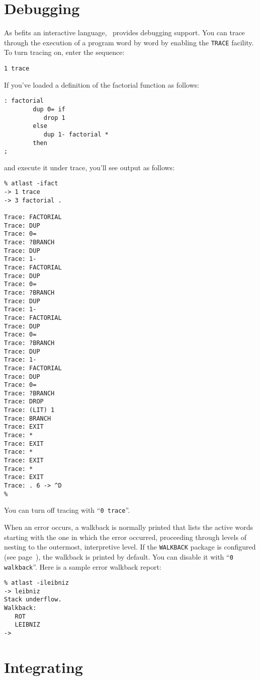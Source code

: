 \documentclass[twocolumn]{article}
\begin{document}
\section{Debugging}

As befits an interactive language, \atlast\ provides debugging support.
You can trace through the execution of a program word by word by
enabling the {\tt TRACE} facility.  To turn tracing on, enter the
sequence:

{\tt 1 trace}

If you've loaded a definition of the factorial function as follows:

\begin{verbatim}
: factorial
        dup 0= if
           drop 1
        else
           dup 1- factorial *
        then
;
\end{verbatim}

and execute it under trace, you'll see output as
follows:

\begin{verbatim}
% atlast -ifact
-> 1 trace
-> 3 factorial .

Trace: FACTORIAL 
Trace: DUP 
Trace: 0= 
Trace: ?BRANCH 
Trace: DUP 
Trace: 1- 
Trace: FACTORIAL 
Trace: DUP 
Trace: 0= 
Trace: ?BRANCH 
Trace: DUP 
Trace: 1- 
Trace: FACTORIAL 
Trace: DUP 
Trace: 0= 
Trace: ?BRANCH 
Trace: DUP 
Trace: 1- 
Trace: FACTORIAL 
Trace: DUP 
Trace: 0= 
Trace: ?BRANCH 
Trace: DROP 
Trace: (LIT) 1 
Trace: BRANCH 
Trace: EXIT 
Trace: * 
Trace: EXIT 
Trace: * 
Trace: EXIT 
Trace: * 
Trace: EXIT 
Trace: . 6 -> ^D
%
\end{verbatim}

You can turn off tracing with ``{\tt 0 trace}''.

When an error occurs, a walkback is normally printed that lists the
active words starting with the one in which the error occurred,
proceeding through levels of nesting to the outermost, interpretive
level.  If the {\tt WALKBACK} package is configured (see
page~\pageref{`wback'}), the walkback is printed by default.  You can
disable it with ``{\tt 0 walkback}''.  Here is a sample error
walkback report:

\begin{verbatim}
% atlast -ileibniz
-> leibniz
Stack underflow.
Walkback:
   ROT
   LEIBNIZ
->
\end{verbatim}

\section{Integrating \atlast}
\end{document}
